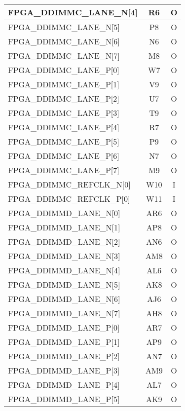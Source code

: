 \begin{longtable}[l]{| l | c | c |}
  FPGA\_DDIMMC\_LANE\_N[4]     & R6   & O   \\ \hline
  FPGA\_DDIMMC\_LANE\_N[5]     & P8   & O   \\ \hline
  FPGA\_DDIMMC\_LANE\_N[6]     & N6   & O   \\ \hline
  FPGA\_DDIMMC\_LANE\_N[7]     & M8   & O   \\ \hline
  FPGA\_DDIMMC\_LANE\_P[0]     & W7   & O   \\ \hline
  FPGA\_DDIMMC\_LANE\_P[1]     & V9   & O   \\ \hline
  FPGA\_DDIMMC\_LANE\_P[2]     & U7   & O   \\ \hline
  FPGA\_DDIMMC\_LANE\_P[3]     & T9   & O   \\ \hline
  FPGA\_DDIMMC\_LANE\_P[4]     & R7   & O   \\ \hline
  FPGA\_DDIMMC\_LANE\_P[5]     & P9   & O   \\ \hline
  FPGA\_DDIMMC\_LANE\_P[6]     & N7   & O   \\ \hline
  FPGA\_DDIMMC\_LANE\_P[7]     & M9   & O   \\ \hline
  FPGA\_DDIMMC\_REFCLK\_N[0]   & W10  & I   \\ \hline
  FPGA\_DDIMMC\_REFCLK\_P[0]   & W11  & I   \\ \hline
  FPGA\_DDIMMD\_LANE\_N[0]     & AR6  & O   \\ \hline
  FPGA\_DDIMMD\_LANE\_N[1]     & AP8  & O   \\ \hline
  FPGA\_DDIMMD\_LANE\_N[2]     & AN6  & O   \\ \hline
  FPGA\_DDIMMD\_LANE\_N[3]     & AM8  & O   \\ \hline
  FPGA\_DDIMMD\_LANE\_N[4]     & AL6  & O   \\ \hline
  FPGA\_DDIMMD\_LANE\_N[5]     & AK8  & O   \\ \hline
  FPGA\_DDIMMD\_LANE\_N[6]     & AJ6  & O   \\ \hline
  FPGA\_DDIMMD\_LANE\_N[7]     & AH8  & O   \\ \hline
  FPGA\_DDIMMD\_LANE\_P[0]     & AR7  & O   \\ \hline
  FPGA\_DDIMMD\_LANE\_P[1]     & AP9  & O   \\ \hline
  FPGA\_DDIMMD\_LANE\_P[2]     & AN7  & O   \\ \hline
  FPGA\_DDIMMD\_LANE\_P[3]     & AM9  & O   \\ \hline
  FPGA\_DDIMMD\_LANE\_P[4]     & AL7  & O   \\ \hline
  FPGA\_DDIMMD\_LANE\_P[5]     & AK9  & O   \\ \hline

\end{longtable}
